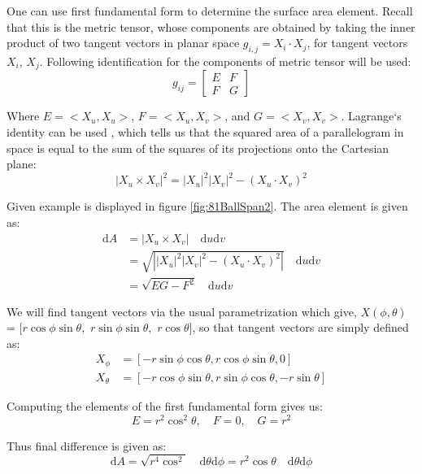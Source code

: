 \noindent One can use first fundamental form to determine the surface area element. Recall that this is the metric tensor, whose components are obtained by taking the inner product of two tangent vectors in planar space $g_{i,j}= X_i \cdot X_j$, for tangent vectors $X_i$, $X_j$. Following identification for the components of metric tensor will be used:
\begin{equation}\label{eq:metricTensorIdentification}
    g_{ij}=
    \begin{bmatrix}
        E&F\\
        F&G
    \end{bmatrix}
\end{equation}

\noindent Where $E=<X_u,X_u>$, $F=<X_u,X_v>$, and $G=<X_v,X_v>$. Lagrange`s identity can be used , which tells us that the squared area of a parallelogram in space is equal to the sum of the squares of its projections onto the Cartesian plane:
\begin{equation}\label{eq:CartesianProjectionIdentity}
    |X_u \times X_v|^2 = |X_u|^2|X_v|^2 - \left(X_u\cdot X_v\right)^2
\end{equation}

\noindent Given example is displayed in figure \ref{fig:81BallSpan2}. The area element is given as:
\begin{equation}\label{eq:squareElementSurfaceDerivation}
    \begin{aligned}
    \text{d}A &= |X_u \times X_v| \quad\text{d}u\text{d}v \\
    & = \sqrt{\left||X_u|^2|X_v|^2 - \left(X_u\cdot X_v\right)^2\right|}\quad \text{d}u\text{d}v\\ 
    & = \sqrt{EG-F^2} \quad \text{d}u\text{d}v
    \end{aligned}
\end{equation}

\noindent We will find tangent vectors via the usual parametrization which give, $X(\phi,\theta)$ = $[r \cos\phi\sin\theta,$ $r\sin\phi\sin\theta,$ $r\cos\theta]$, so that tangent vectors are simply defined as:
\begin{equation}\label{eq:tangentVectorsForPlanarSurface}
    \begin{aligned}
        X_\phi &= [-r\sin\phi\cos\theta,r\cos\phi\sin\theta,0]\\
        X_\theta &=[-r\cos\phi\sin\theta,r\sin\phi\cos\theta,-r\sin\theta]
    \end{aligned}
\end{equation}

\noindent Computing the elements of the first fundamental form gives us:
\begin{equation}
    E = r^2\cos^2\theta,\quad F=0,\quad G=r^2
\end{equation}

\noindent Thus final difference is given as:
\begin{equation}\label{eq:finalCellSquare}
    \text{d}A=\sqrt{r^4\cos^2}\quad \text{d}\theta\text{d}\phi = r^2 \cos\theta\quad \text{d}\theta\text{d}\phi
\end{equation}
